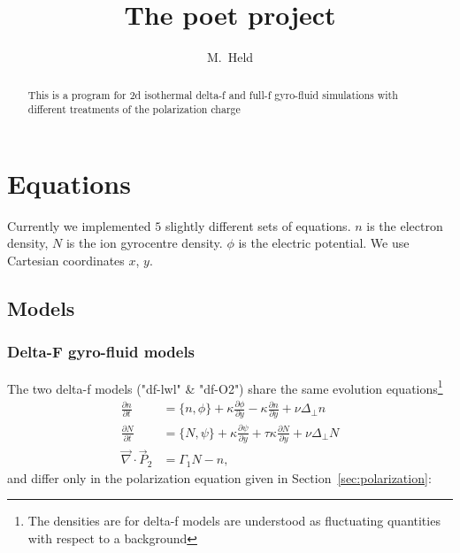 

\usepackage{minted}



\title{The poet project}
\author{M.~Held}
\maketitle

\begin{abstract}
  This is a program for 2d isothermal delta-f and full-f gyro-fluid simulations with different treatments of the polarization charge
\end{abstract}

\section{Equations}
Currently we implemented $5$ slightly different sets of equations. $n$ is the electron density, $N$ is the ion gyrocentre density. $\phi$ is the electric potential. We
use Cartesian coordinates $x$, $y$.
\subsection{Models}
\subsubsection{Delta-F gyro-fluid models}
The two delta-f models ("df-lwl" \& "df-O2") share the same evolution equations\footnote{The densities are for delta-f models are understood as fluctuating quantities with respect to a background} 
\begin{subequations}
\begin{align}
 \frac{\partial n}{\partial t}     &= 
    \{ n, \phi\} 
  + \kappa \frac{\partial \phi}{\partial y} 
  -\kappa \frac{\partial n}{\partial y}
  + \nu \Delta_{\perp} n  \\
  \frac{\partial N}{\partial t} &=
  \{ N, \psi\} 
  + \kappa \frac{\partial \psi}{\partial y} 
  + \tau \kappa\frac{\partial N}{\partial y} +\nu\Delta_{\perp}N \\
   \vec{\nabla}\cdot \vec{P}_2 &=  \Gamma_1 N -n, 
\end{align}
\end{subequations}
and differ only in the polarization equation given in Section~\ref{sec:polarization}:
